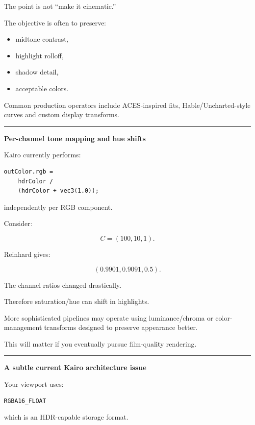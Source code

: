 The point is not ``make it cinematic.''

The objective is often to preserve:

\begin{itemize}
\tightlist
\item
  midtone contrast,
\item
  highlight rolloff,
\item
  shadow detail,
\item
  acceptable colors.
\end{itemize}

Common production operators include ACES-inspired fits, Hable/Uncharted-style curves and custom display transforms.

\begin{center}\rule{0.5\linewidth}{0.5pt}\end{center}

\textbf{Per-channel tone mapping and hue shifts}

Kairo currently performs:

\begin{verbatim}
outColor.rgb =
    hdrColor /
    (hdrColor + vec3(1.0));
\end{verbatim}

independently per RGB component.

Consider:

\[
C=(100,10,1).
\]

Reinhard gives:

\[
(0.9901,0.9091,0.5).
\]

The channel ratios changed drastically.

Therefore saturation/hue can shift in highlights.

More sophisticated pipelines may operate using luminance/chroma or color-management transforms designed to preserve appearance better.

This will matter if you eventually pursue film-quality rendering.

\begin{center}\rule{0.5\linewidth}{0.5pt}\end{center}

\textbf{A subtle current Kairo architecture issue}

Your viewport uses:

\begin{verbatim}
RGBA16_FLOAT
\end{verbatim}

which is an HDR-capable storage format.

